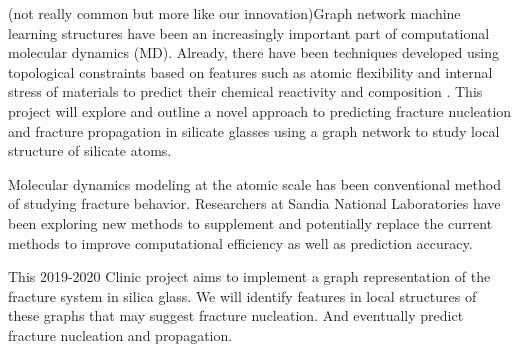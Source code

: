 (not really common but more like our innovation)Graph network machine learning structures have been an increasingly important part of computational molecular dynamics (MD). Already, there have been techniques developed using topological constraints based on features such as atomic flexibility and internal stress of materials to predict their chemical reactivity and composition \cite{bauchy}. This project will explore and outline a novel approach to predicting fracture nucleation and fracture propagation in silicate glasses using a graph network to study local structure of silicate atoms. 

Molecular dynamics modeling at the atomic scale has been conventional method of studying fracture behavior. Researchers at Sandia National Laboratories have been exploring new methods to supplement and potentially replace the current methods to improve computational efficiency as well as prediction accuracy. 

This 2019-2020 Clinic project aims to implement a graph representation of the fracture system in silica glass. We will identify features in local structures of these graphs that may suggest fracture nucleation. And eventually predict fracture nucleation and propagation.